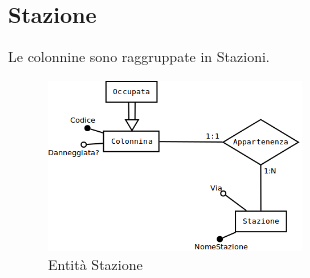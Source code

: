 \documentclass[a4paper,twoside]{article}
\begin{document}
\subsection{Stazione}
Le colonnine sono raggruppate in Stazioni.
\begin{figure}[H]
 \centering
  \includegraphics[width=0.6\textwidth]{Concettuale11}
\caption{Entità Stazione}
\end{figure}
\end{document}
